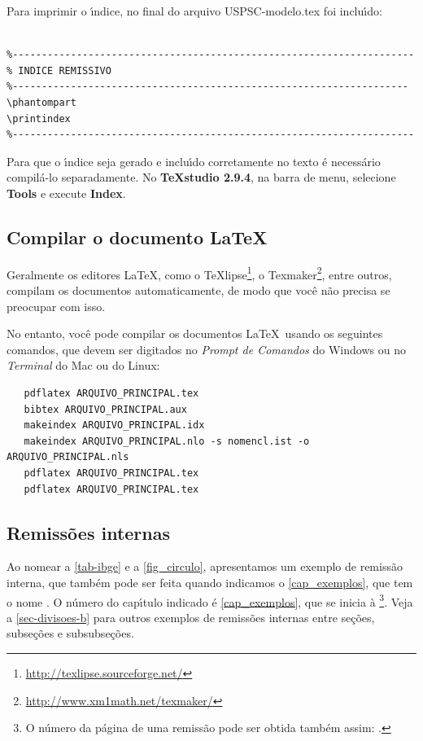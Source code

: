 Para imprimir o \'{\i}ndice, no final do arquivo USPSC-modelo.tex foi inclu\'{\i}do:

\begin{verbatim}

%---------------------------------------------------------------------
% INDICE REMISSIVO
%--------------------------------------------------------------------
\phantompart
\printindex
%---------------------------------------------------------------------
\end{verbatim}

Para que o \'{\i}ndice seja gerado e inclu\'{\i}do corretamente no texto \'e necess\'ario compil\'a-lo separadamente. No \textbf{TeXstudio 2.9.4}, na barra de menu, selecione \textbf{Tools} e execute \textbf{Index}.


\subsection{Compilar o documento \LaTeX}

Geralmente os editores \LaTeX, como o
TeXlipse\footnote{\url{http://texlipse.sourceforge.net/}}, o
Texmaker\footnote{\url{http://www.xm1math.net/texmaker/}}, entre outros,
compilam os documentos automaticamente, de modo que voc\^e n\~ao precisa se
preocupar com isso.

No entanto, voc\^e pode compilar os documentos \LaTeX\ usando os seguintes
comandos, que devem ser digitados no \emph{Prompt de Comandos} do Windows ou no
\emph{Terminal} do Mac ou do Linux:

\begin{verbatim}
   pdflatex ARQUIVO_PRINCIPAL.tex
   bibtex ARQUIVO_PRINCIPAL.aux
   makeindex ARQUIVO_PRINCIPAL.idx 
   makeindex ARQUIVO_PRINCIPAL.nlo -s nomencl.ist -o ARQUIVO_PRINCIPAL.nls
   pdflatex ARQUIVO_PRINCIPAL.tex
   pdflatex ARQUIVO_PRINCIPAL.tex
\end{verbatim}

\subsection{Remiss\~oes internas}

Ao nomear a \autoref{tab-ibge} e a \autoref{fig_circulo}, apresentamos um exemplo de remiss\~ao interna, que tamb\'em pode ser feita quando indicamos o
\autoref{cap_exemplos}, que tem o nome \emph{}. O n\'umero
do cap\'{\i}tulo indicado \'e \ref{cap_exemplos}, que se inicia \`a
\footnote{O n\'umero da p\'agina de uma remiss\~ao pode ser
	obtida tamb\'em assim:
	\pageref{cap_exemplos}.}.
Veja a \autoref{sec-divisoes-b} para outros exemplos de remiss\~oes internas entre
se\c{c}\~oes, subse\c{c}\~oes e subsubse\c{c}\~oes.

